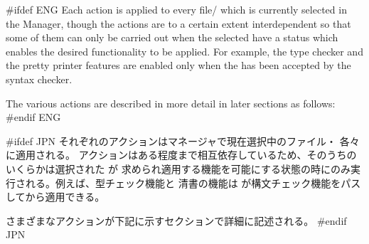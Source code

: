 \documentclass[\pformat,12pt]{article}
\newcommand{\guicmd}[1]{{\sf #1}}
\newcommand{\guicmd}[1]{{\gt #1}}
\begin{document}
#ifdef ENG
Each action is applied to every
file/ which is currently
selected in the \guicmd{Manager}, though the actions are to a certain
extent interdependent so that some of them can only be carried out 
 when the selected  have
 a status which enables the desired functionality to be applied. For
 example, the type checker and the pretty printer features are 
enabled only when the  has
been accepted by the syntax checker.

The various actions are described in more detail in later sections as follows:
#endif ENG

#ifdef JPN
それぞれのアクションはマネージャで現在選択中のファイル・
 各々に適用される。
アクションはある程度まで相互依存しているため、そのうちのいくらかは選択された
  が
求められ適用する機能を可能にする状態の時にのみ実行される。例えば、型チェック機能と
清書の機能は
 が構文チェック機能をパスしてから適用できる。

さまざまなアクションが下記に示すセクションで詳細に記述される。
#endif JPN
\end{document}
